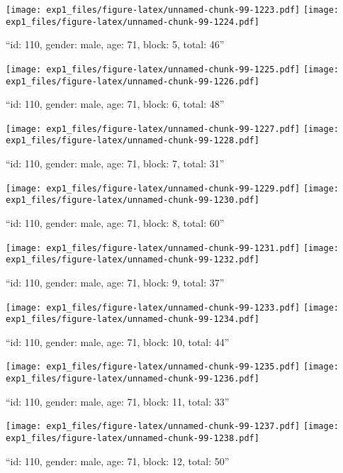 \documentclass[,]{article}
\begin{document}
\texttt{[image: exp1\_files/figure-latex/unnamed-chunk-99-1223.pdf]}
\texttt{[image: exp1\_files/figure-latex/unnamed-chunk-99-1224.pdf]}

\newpage
[1] 

``id: 110, gender: male, age: 71, block: 5, total: 46''

\texttt{[image: exp1\_files/figure-latex/unnamed-chunk-99-1225.pdf]}
\texttt{[image: exp1\_files/figure-latex/unnamed-chunk-99-1226.pdf]}

\newpage
[1] 

``id: 110, gender: male, age: 71, block: 6, total: 48''

\texttt{[image: exp1\_files/figure-latex/unnamed-chunk-99-1227.pdf]}
\texttt{[image: exp1\_files/figure-latex/unnamed-chunk-99-1228.pdf]}

\newpage
[1] 

``id: 110, gender: male, age: 71, block: 7, total: 31''

\texttt{[image: exp1\_files/figure-latex/unnamed-chunk-99-1229.pdf]}
\texttt{[image: exp1\_files/figure-latex/unnamed-chunk-99-1230.pdf]}

\newpage
[1] 

``id: 110, gender: male, age: 71, block: 8, total: 60''

\texttt{[image: exp1\_files/figure-latex/unnamed-chunk-99-1231.pdf]}
\texttt{[image: exp1\_files/figure-latex/unnamed-chunk-99-1232.pdf]}

\newpage
[1] 

``id: 110, gender: male, age: 71, block: 9, total: 37''

\texttt{[image: exp1\_files/figure-latex/unnamed-chunk-99-1233.pdf]}
\texttt{[image: exp1\_files/figure-latex/unnamed-chunk-99-1234.pdf]}

\newpage
[1] 

``id: 110, gender: male, age: 71, block: 10, total: 44''

\texttt{[image: exp1\_files/figure-latex/unnamed-chunk-99-1235.pdf]}
\texttt{[image: exp1\_files/figure-latex/unnamed-chunk-99-1236.pdf]}

\newpage
[1] 

``id: 110, gender: male, age: 71, block: 11, total: 33''

\texttt{[image: exp1\_files/figure-latex/unnamed-chunk-99-1237.pdf]}
\texttt{[image: exp1\_files/figure-latex/unnamed-chunk-99-1238.pdf]}

\newpage
[1] 

``id: 110, gender: male, age: 71, block: 12, total: 50''
\end{document}
